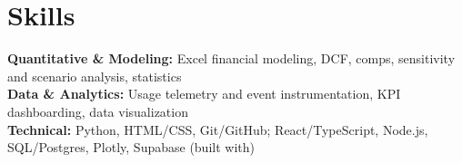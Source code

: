 \documentclass[10pt,letterpaper]{article}
\begin{document}
\section*{Skills}
\textbf{Quantitative \& Modeling:} Excel financial modeling, DCF, comps, sensitivity and scenario analysis, statistics\\[2pt]
\textbf{Data \& Analytics:} Usage telemetry and event instrumentation, KPI dashboarding, data visualization\\[2pt]
\textbf{Technical:} Python, HTML/CSS, Git/GitHub; React/TypeScript, Node.js, SQL/Postgres, Plotly, Supabase (built with)
\end{document}

